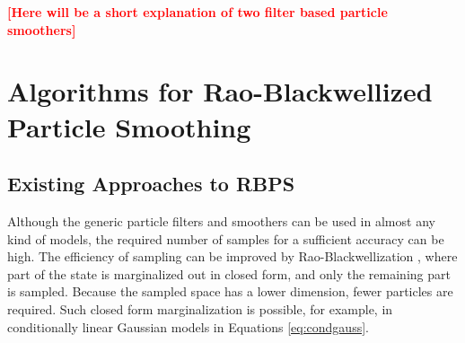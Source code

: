 \documentclass[twocolumn]{autart}    %
\newcommand{\comment}[1]{\textcolor{red}{\textbf{[#1]}}}
\begin{document}
\comment{Here will be a short explanation of two filter based particle
  smoothers}


\section{Algorithms for Rao-Blackwellized Particle Smoothing}

\subsection{Existing Approaches to RBPS}
%
Although the generic particle filters and smoothers can be used in
almost any kind of models, the required number of samples for a
sufficient accuracy can be high. The efficiency of sampling can be
improved by Rao-Blackwellization
\cite{Doucet+Godsill+Andrieu:2000,Chen+Liu:2000}, where part of the
state is marginalized out in closed form, and only the remaining part
is sampled. Because the sampled space has a lower dimension, fewer
particles are required. Such closed form marginalization is possible,
for example, in conditionally linear Gaussian models in Equations
\eqref{eq:condgauss}.
\end{document}
